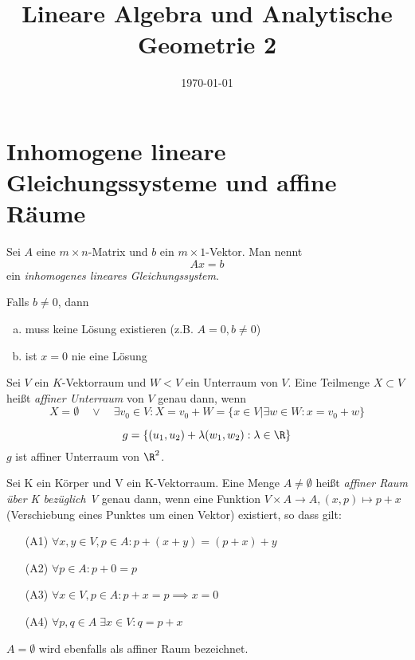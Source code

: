 \documentclass[a4paper, 10pt]{scrbook}
\title{Lineare Algebra und Analytische Geometrie 2}
\author{}
\date{\today}
\begin{document}
\maketitle
\tableofcontents
\newpage

\setcounter{section}{7}
\chapter{Inhomogene lineare Gleichungssysteme und affine Räume}

\begin{df} 
	\label{df: 8.1}
	Sei $A$ eine $m\times n$-Matrix und $b$ ein $m\times 1$-Vektor.
	Man nennt
	\[
		Ax = b
	\]
	ein \emph{inhomogenes lineares Gleichungssystem}.
	\begin{note}
		Falls $b\ne 0$, dann
		\begin{enumerate}[a)]
			\item muss keine Lösung existieren (z.B. $A=0, b\ne 0$)
			\item ist $x=0$ nie eine Lösung
		\end{enumerate}
	\end{note}
\end{df}

\begin{df} 
	\label{df: 8.2}
	Sei $V$ ein $K$-Vektorraum und $W<V$ ein Unterraum von $V$.
	Eine Teilmenge $X\subset V$ heißt \emph{affiner Unterraum} von $V$ genau dann, wenn
	\[
		X=\emptyset \quad \lor \quad \exists v_0\in V:X=v_0+W=\{x\in V | \exists w\in W:x=v_0+w\}
	\]
	\begin{ex}[Gerade im $\R^2$]
		\[ g=\{(u_1,u_2)+\lambda(w_1,w_2):\lambda\in\R\} \]
		$g$ ist affiner Unterraum von $\R^2$.
	\end{ex}
\end{df}

\begin{df} \label{df: 8.3}
Sei K ein Körper und V ein K-Vektorraum. Eine Menge $A \neq \emptyset$ heißt \textit{affiner Raum über K bezüglich V}
genau dann, wenn eine Funktion $V \times A \rightarrow A, (x,p) \mapsto p+x$ (Verschiebung eines Punktes um einen Vektor) existiert, so dass gilt:
\begin{enumerate}
\item[(A1)] \label{itm: aff1} $\forall x,y \in V, p \in A : p+(x+y)=(p+x)+y \qquad $
\item[(A2)] \label{itm: aff2} $\forall p \in A : p+0=p \qquad $
\item[(A3)] \label{itm: aff3} $\forall x \in V, p \in A: p+x=p \implies x = 0$
\item[(A4)] \label{itm: aff4} $\forall p, q \in A \;\exists x\in V : q=p+x$
\end{enumerate}
$A=\emptyset$ wird ebenfalls als affiner Raum bezeichnet.
\end{df}
\end{document}
